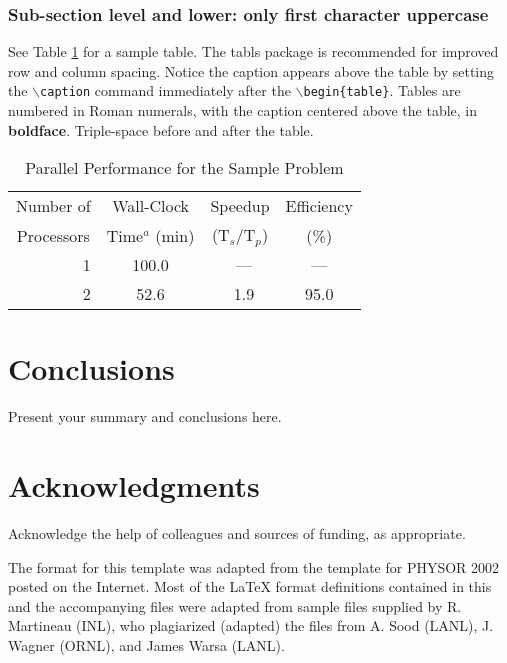 \documentclass{ansconf}
\begin{document}
\subsubsection{Sub-section level and lower: only first character uppercase}

See Table \ref{table:example} for a sample table.  The tabls package is
recommended for improved row and column spacing.  Notice the caption appears 
above the table by setting the \texttt{$\backslash$caption} command immediately 
after the \texttt{$\backslash$begin\{table\}}. Tables are numbered in Roman 
numerals, with the caption centered above the table, in {\bf boldface}.  
Triple-space before and after the table.

\vspace{16pt}
\begin{table}[!htb]
\centering
\caption{Parallel Performance for the Sample Problem}
\label{table:example} 
\vspace{14pt}
\begin{tabular}{||r||c|c|c||} \hline \hline
 \multicolumn{1}{||c||}{Number of} &
 \multicolumn{1}{c|}{Wall-Clock} &
 \multicolumn{1}{c|}{Speedup} &
 \multicolumn{1}{c||}{Efficiency} \\
 \multicolumn{1}{||c||}{Processors} &
 \multicolumn{1}{c|}{Time$^{a}$ (min)} &
 \multicolumn{1}{c|}{(T$_{s}$/T$_{p}$)} &
 \multicolumn{1}{c||}{(\%)} \\ \hline\hline
\ 1 &  100.0 & \ ---    & ---  \\ \hline
\ 2 &   52.6 & \ 1.9    & 95.0 \\ \hline \hline
\end{tabular}
\end{table}
\vspace{16pt}


\section{Conclusions}

Present your summary and conclusions here.


\section*{Acknowledgments}

Acknowledge the help of colleagues and sources of funding, as appropriate.

The format for this template was adapted from the template for PHYSOR 2002 
posted on the Internet.  Most of the {\LaTeX} format definitions contained
in this and the accompanying files were adapted from sample files supplied 
by R. Martineau (INL), who plagiarized (adapted) the files from A. Sood 
(LANL), J. Wagner (ORNL), and James Warsa (LANL).


\setlength{\baselineskip}{12pt}



\end{document}
